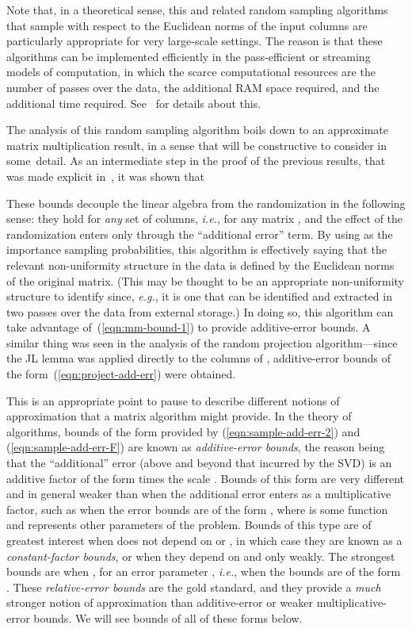 \documentclass[twoside]{article}
\begin{document}
Note that, in a theoretical sense, this and related random sampling 
algorithms that sample with respect to the Euclidean norms of the input 
columns are particularly appropriate for very large-scale settings.  
The reason is that these algorithms can be implemented efficiently in the
pass-efficient or streaming models of computation, in which 
the scarce computational resources are the number of passes over the data, 
the additional RAM space required, and the additional time required. 
See~\cite{dkm_matrix1,dkm_matrix2} for details about this.

The analysis of this random sampling algorithm boils down to an approximate matrix 
multiplication result, in a sense that will be constructive to consider 
in some~detail.
As an intermediate step in the proof of the previous results, that was 
made explicit in~\cite{dkm_matrix2}, it was shown that

These bounds decouple the linear 
algebra from the randomization in the following sense: they hold for 
\emph{any} set of columns, \emph{i.e.}, for any matrix , and the effect of the randomization enters only 
through the ``additional error'' term.
By using  as the importance sampling 
probabilities, this algorithm is effectively saying that the relevant 
non-uniformity structure in the data is defined by the Euclidean norms of 
the original matrix.
(This may be thought to be an appropriate non-uniformity structure to 
identify since, \emph{e.g.}, it is one that can be identified and extracted
in two passes over the data from external storage.)
In doing so, this algorithm can take advantage of~(\ref{eqn:mm-bound-1}) to 
provide additive-error bounds.
A similar thing was seen in the analysis of the random projection 
algorithm---since the JL lemma was applied directly to the columns of , 
additive-error bounds of the form~(\ref{eqn:project-add-err}) were 
obtained.

This is an appropriate point to pause to describe different notions of 
approximation that a matrix algorithm might provide.
In the theory of algorithms, bounds of the form provided by 
(\ref{eqn:sample-add-err-2}) and (\ref{eqn:sample-add-err-F}) are known as 
\emph{additive-error bounds}, the reason being that the ``additional'' 
error (above and beyond that incurred by the SVD) is an additive factor of 
the form  times the scale .
Bounds of this form are very different and in general weaker than when the 
additional error enters as a multiplicative factor, such as when the error 
bounds are of the form 
, where  is 
some function and  represents other parameters of the problem. 
Bounds of this type are of greatest interest when  does not 
depend on  or , in which case they are known as a \emph{constant-factor 
bounds}, or when they depend on  and  only weakly.
The strongest bounds are when , for an error parameter 
, \emph{i.e.}, when the bounds are of the form
.
These \emph{relative-error bounds} are the gold standard, and they provide a 
\emph{much} stronger notion of approximation than additive-error or 
weaker multiplicative-error bounds.
We will see bounds of all of these forms below.  
\end{document}
